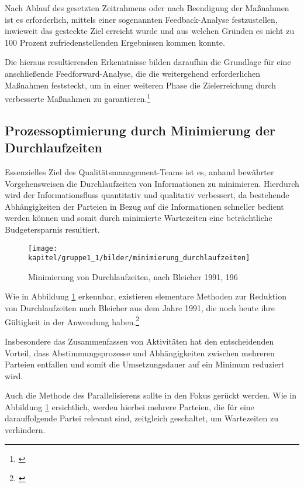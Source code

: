 Nach Ablauf des gesetzten Zeitrahmens oder nach Beendigung der Maßnahmen ist es erforderlich, mittels einer sogenannten Feedback-Analyse festzustellen, inwieweit das gesteckte Ziel erreicht wurde und aus welchen Gründen es nicht zu 100 Prozent zufriedenstellenden Ergebnissen kommen konnte.

Die hieraus resultierenden Erkenntnisse bilden daraufhin die Grundlage für eine anschließende Feedforward-Analyse, die die weitergehend erforderlichen Maßnahmen feststeckt, um in einer weiteren Phase die Zielerreichung durch verbesserte Maßnahmen zu garantieren.\footnote{\cite{gadatsch_it-controlling_2012}}

\subsection{Prozessoptimierung durch Minimierung der Durchlaufzeiten}
Essenzielles Ziel des Qualitätsmanagement-Teams ist es, anhand bewährter Vorgehensweisen die Durchlaufzeiten von Informationen zu minimieren. 
Hierdurch wird der Informationsfluss quantitativ und qualitativ verbessert, da bestehende Abhängigkeiten der Parteien in Bezug auf die Informationen schneller bedient werden können und somit durch minimierte Wartezeiten eine beträchtliche Budgetersparnis resultiert.

\begin{figure}[h!]
	\centering
	\texttt{[image: kapitel/gruppe1\_1/bilder/minimierung\_durchlaufzeiten]}
	\caption{Minimierung von Durchlaufzeiten, nach Bleicher 1991, 196}
	\label{fig_minimierung_durchlaufzeiten}
\end{figure}
\newpage

Wie in Abbildung \ref{fig_minimierung_durchlaufzeiten} erkennbar, existieren elementare Methoden zur Reduktion von Durchlaufzeiten nach Bleicher aus dem Jahre 1991, die noch heute ihre Gültigkeit in der Anwendung haben.\footnote{\cite{bleicher_organisation_1991}}

Insbesondere das Zusammenfassen von Aktivitäten hat den entscheidenden Vorteil, dass Abstimmungsprozesse und Abhängigkeiten zwischen mehreren Parteien entfallen und somit die Umsetzungsdauer auf ein Minimum reduziert wird. 

Auch die Methode des Parallelisierens sollte in den Fokus gerückt werden. Wie in Abbildung \ref{fig_minimierung_durchlaufzeiten} ersichtlich, werden hierbei mehrere Parteien, die für eine darauffolgende Partei relevant sind, zeitgleich geschaltet, um Wartezeiten zu verhindern. 


